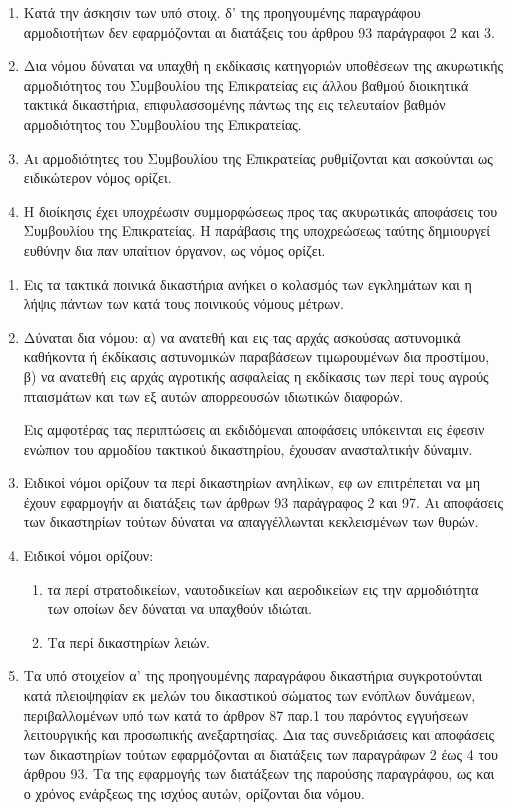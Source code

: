 \documentclass[twoside, a4paper, 10pt]{article}
\begin{document}
\begin{multicols}{2}
\begin{enumerate}
\begin{BigQuote}
\begin{enumerate}
  \item[2.] Κατά την άσκησιν των υπό στοιχ. δ' της προηγουμένης παραγράφου αρμοδιοτήτων δεν εφαρμόζονται αι διατάξεις του άρθρου 93 παράγραφοι 2 και 3.
  \item[3.] Δια νόμου δύναται να υπαχθή η εκδίκασις κατηγοριών υποθέσεων της ακυρωτικής αρμοδιότητος του Συμβουλίου της Επικρατείας εις άλλου βαθμού διοικητικά
 τακτικά δικαστήρια, επιφυλασσομένης πάντως της εις τελευταίον βαθμόν αρμοδιότητος του Συμβουλίου της Επικρατείας.
  \item[4.] Αι αρμοδιότητες του Συμβουλίου της Επικρατείας ρυθμίζονται και ασκούνται ως ειδικώτερον νόμος ορίζει.
  \item[5.] Η διοίκησις έχει υποχρέωσιν συμμορφώσεως προς τας ακυρωτικάς αποφάσεις του Συμβουλίου της Επικρατείας. Η παράβασις της υποχρεώσεως ταύτης δημιουργεί ευθύνην δια παν υπαίτιον όργανον, ως νόμος ορίζει.
\end{enumerate}

\begin{enumerate}
  \item[1.] Εις τα τακτικά ποινικά δικαστήρια ανήκει ο κολασμός των εγκλημάτων και η λήψις πάντων των κατά τους ποινικούς νόμους μέτρων.
  \item[2.] Δύναται  δια νόμου: α) να ανατεθή και εις τας αρχάς ασκούσας αστυνομικά καθήκοντα ή έκδίκασις αστυνομικών παραβάσεων τιμωρουμένων δια προστίμου, β) να ανατεθή εις αρχάς αγροτικής ασφαλείας η εκδίκασις των περί τους αγρούς πταισμάτων και των εξ αυτών απορρεουσών ιδιωτικών διαφορών.

	Εις αμφοτέρας  τας περιπτώσεις αι εκδιδόμεναι αποφάσεις υπόκεινται εις έφεσιν ενώπιον του αρμοδίου τακτικού δικαστηρίου, έχουσαν ανασταλτικήν δύναμιν.
  \item[3.] Ειδικοί νόμοι ορίζουν τα περί δικαστηρίων ανηλίκων, εφ ων επιτρέπεται να μη έχουν εφαρμογήν αι διατάξεις των άρθρων 93 παράγραφος 2 και 97. Αι αποφάσεις των δικαστηρίων τούτων δύναται να απαγγέλλωνται κεκλεισμένων των θυρών.
  \item[4.] Ειδικοί νόμοι ορίζουν:
  \begin{enumerate}
    \item[α)] τα περί στρατοδικείων, ναυτοδικείων και αεροδικείων εις την αρμοδιότητα των οποίων δεν δύναται να υπαχθούν ιδιώται.
	\item[β)] Τα περί δικαστηρίων λειών.
  \end{enumerate}
  \item[5.] Τα υπό στοιχείον α' της προηγουμένης παραγράφου δικαστήρια συγκροτούνται κατά πλειοψηφίαν εκ μελών του δικαστικού σώματος των ενόπλων δυνάμεων, περιβαλλομένων υπό των κατά το άρθρον 87 παρ.1 του παρόντος εγγυήσεων λειτουργικής και προσωπικής ανεξαρτησίας. Δια τας συνεδριάσεις και αποφάσεις των δικαστηρίων τούτων εφαρμόζονται αι διατάξεις των παραγράφων 2 έως 4 του άρθρου 93. Τα της εφαρμογής των διατάξεων της παρούσης παραγράφου, ως και ο χρόνος ενάρξεως της ισχύος αυτών, ορίζονται δια νόμου.
\end{enumerate}


\end{BigQuote}
\end{enumerate}
\end{multicols}
\end{document}
